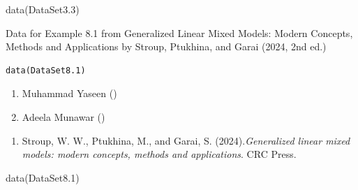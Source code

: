 \documentclass[a4paper]{book}
\begin{document}
%
\begin{Examples}
\begin{ExampleCode}
data(DataSet3.3)
\end{ExampleCode}
\end{Examples}
%
\begin{Description}
Data for Example 8.1 from Generalized Linear Mixed Models: Modern Concepts, Methods and Applications by Stroup, Ptukhina, and Garai (2024, 2nd ed.)
\end{Description}
%
\begin{Usage}
\begin{verbatim}
data(DataSet8.1)
\end{verbatim}
\end{Usage}
%
\begin{Author}
\begin{enumerate}

\item{}  Muhammad Yaseen ()
\item{} Adeela Munawar ()

\end{enumerate}

\end{Author}
%
\begin{References}
\begin{enumerate}

\item{} Stroup, W. W., Ptukhina, M., and Garai, S. (2024).\emph{Generalized linear mixed models: modern concepts, methods and applications}.
CRC Press.

\end{enumerate}

\end{References}
%
\begin{SeeAlso}
\end{SeeAlso}
%
\begin{Examples}
\begin{ExampleCode}
data(DataSet8.1)
\end{ExampleCode}
\end{Examples}
\end{document}
